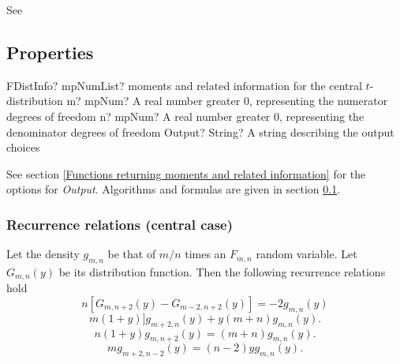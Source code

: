 See \cite{guenther_calculation_1977}









\subsection{Properties}
\label{FDistributionProperties}

\begin{mpFunctionsExtract}
	\mpFunctionThreeNotImplemented
	{FDistInfo? mpNumList? moments and related information for the central $t$-distribution}
	{m? mpNum? A real number greater 0, representing the numerator  degrees of freedom}
	{n? mpNum? A real number greater 0, representing the denominator degrees of freedom}
	{Output? String? A string describing the output choices}
\end{mpFunctionsExtract}

\vspace{0.3cm}

See section \ref{Functions returning moments and related information} for the options for {\itshape\sffamily Output}. Algorithms and formulas are given in section \ref{FDistributionProperties}.


\subsubsection{Recurrence relations (central case)}
\label{CentralF_Recursion}
Let the density $g_{m,n}$ be that of $m/n$ times an $F_{m,n}$ random variable. Let $G_{m,n}(y)$ be its distribution function. Then the following recurrence relations hold \citep{Chattamvelli_1995}
\begin{equation} \label{eq:CentralF_Recursion}
n\left[G_{m,n+2}(y)-G_{m-2,n+2}(y)\right] =  -2g_{m,n}(y)
\end{equation} 
\begin{equation} \label{eq:CentralF_Recursion_pdf_1}
m(1+y)]g_{m+2,n}(y) + y(m+n)g_{m,n}(y).
\end{equation} 
\begin{equation} \label{eq:CentralF_Recursion_pdf_2}
n(1+y) g_{m,n+2}(y) = (m+n)g_{m,n}(y).
\end{equation} 
\begin{equation} \label{eq:CentralF_Recursion_pdf_3}
m g_{m+2,n-2}(y) = (n-2) y  g_{m,n}(y).
\end{equation} 

